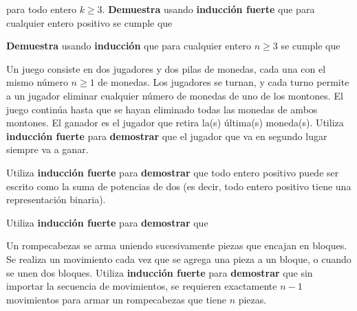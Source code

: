 \documentclass[oneside]{style}
\begin{document}
\begin{questions}[label=\protect\circled{\bfseries\arabic*}]
{        para todo entero $k \geq 3$. \textbf{Demuestra} usando 
        \textbf{inducción fuerte} que para cualquier entero positivo se cumple 
        que 
        \begin{center}
        \end{center}
    }

    \question
    {
        \textbf{Demuestra} usando \textbf{inducción} que para cualquier entero 
        $n \geq 3$ se cumple que 
        \begin{center}
        \end{center}
    }

    \question
    {
        Un juego consiste en dos jugadores y dos pilas de monedas, cada una con 
        el mismo número $n \geq 1$ de monedas. Los jugadores se turnan, y cada 
        turno permite a un jugador eliminar cualquier número de monedas de uno 
        de los montones. El juego continúa hasta que se hayan eliminado todas 
        las monedas de ambos montones. El ganador es el jugador que retira 
        la(s) última(s) moneda(s). Utiliza \textbf{inducción fuerte} para 
        \textbf{demostrar} que el jugador que va en segundo lugar siempre va 
        a ganar. 
    }

    \question
    {
        Utiliza \textbf{inducción fuerte} para \textbf{demostrar} que todo 
        entero positivo puede ser escrito como la suma de potencias de dos 
        (es decir, todo entero positivo tiene una representación binaria). 
    }

    \question
    {
        Utiliza \textbf{inducción fuerte} para \textbf{demostrar} que 
        \begin{center}
        \end{center}
    }

    \question
    {
        Un rompecabezas se arma uniendo sucesivamente piezas que encajan en 
        bloques. Se realiza un movimiento cada vez que se agrega una pieza a 
        un bloque, o cuando se unen dos bloques. Utiliza \textbf{inducción 
        fuerte} para \textbf{demostrar} que sin importar la secuencia de 
        movimientos, se requieren exactamente $n-1$ movimientos para armar 
        un rompecabezas que tiene $n$ piezas.
    }


\end{questions}
\end{document}
